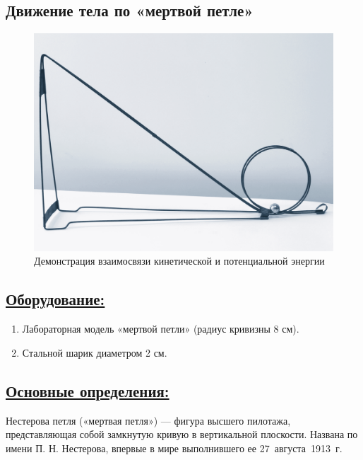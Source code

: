 \documentclass[14pt,a4paper,oneside]{extarticle}	%
\begin{document}

\begin{center}
	\subsection*{Движение тела по «мертвой петле»}
\end{center}

\begin{figure}[H] 
	\centering 		
	\includegraphics[width=0.75\linewidth]{loop-1.png}
	\caption{Демонстрация взаимосвязи кинетической и потенциальной энергии}
	\label{loop-1}
\end{figure}

\subsection*{\underline{Оборудование:}}

\begin{enumerate}
	\item Лабораторная модель «мертвой петли» (радиус кривизны 8 см).
	\item Стальной шарик диаметром 2 см.
\end{enumerate}

\subsection*{\underline{Основные определения:}}

Нестерова петля («мертвая петля») — фигура высшего пилотажа, 
представляющая собой замкнутую кривую в вертикальной плоскости. 
Названа по имени П. Н. Нестерова, впервые в мире выполнившего ее 27~августа~1913~г.
\end{document}
